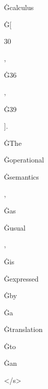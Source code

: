 \documentclass[varwidth]{standalone}
\begin{document}
\begin{CJK*}{UTF8}{gbsn}
{{{\colorbox{red!1.0996826}{\strut Ġcalculus} \colorbox{red!0.23224486}{\strut Ġ[} \colorbox{red!0.30757272}{\strut 30} \colorbox{red!0.10541059}{\strut ,} \colorbox{red!0.11255197}{\strut Ġ36} \colorbox{red!0.07733392}{\strut ,} \colorbox{red!0.25300568}{\strut Ġ39} \colorbox{red!0.05879496}{\strut ].} \colorbox{red!0.21597871}{\strut ĠThe} \colorbox{red!1.1017107}{\strut Ġoperational} \colorbox{red!0.3284595}{\strut Ġsemantics} \colorbox{red!0.07562206}{\strut ,} \colorbox{red!0.26487693}{\strut Ġas} \colorbox{red!0.3391634}{\strut Ġusual} \colorbox{red!0.32373735}{\strut ,} \colorbox{red!0.2730748}{\strut Ġis} \colorbox{red!0.08928454}{\strut Ġexpressed} \colorbox{red!0.16253084}{\strut Ġby} \colorbox{red!0.19359525}{\strut Ġa} \colorbox{red!0.3275671}{\strut Ġtranslation} \colorbox{red!0.33121896}{\strut Ġto} \colorbox{red!0.28796363}{\strut Ġan} \colorbox{red!0.22452387}{\strut </s>} 
}}}
\end{CJK*}
\end{document}
